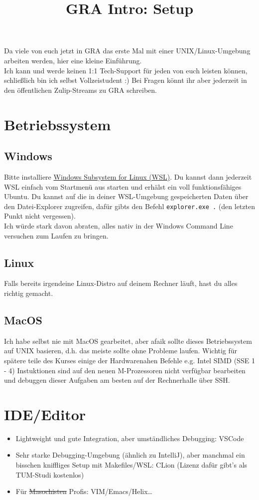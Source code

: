\documentclass{article}
\title{\vspace{-4cm}GRA Intro: Setup}
\date{}
\author{}
\begin{document}
\maketitle
\vspace{-1.5cm}

Da viele von euch jetzt in GRA das erste Mal mit 
einer UNIX/Linux-Umgebung arbeiten werden, hier eine kleine Einführung.\\ Ich kann und werde keinen 1:1 Tech-Support für jeden von euch leisten
können, schließlich bin ich selbst Vollzeistudent :) Bei Fragen könnt ihr aber jederzeit in den öffentlichen Zulip-Streams zu 
GRA schreiben.

\section{Betriebssystem}
    \subsection{Windows}
    Bitte installiere \href{https://learn.microsoft.com/de-de/windows/wsl/install}{Windows Subsystem for Linux (WSL)}.
    Du kannst dann jederzeit WSL einfach vom Startmenü aus starten und erhälst ein voll funktionsfähiges Ubuntu.
    Du kannst auf die in deiner WSL-Umgebung gespeicherten Daten über den Datei-Explorer zugreifen, dafür gibts den Befehl
    \glqq\verb|explorer.exe .|\grqq{} (den letzten Punkt nicht vergessen).\\
    Ich würde stark davon abraten, alles nativ in der Windows Command Line versuchen zum Laufen zu bringen.
    \subsection{Linux}
    Falls bereits irgendeine Linux-Distro auf deinem Rechner läuft, hast du alles
    richtig gemacht.
    \subsection{MacOS}
    Ich habe selbst nie mit MacOS gearbeitet, aber afaik sollte dieses Betriebssystem
    auf UNIX basieren, d.h. das meiste sollte ohne Probleme laufen. 
    Wichtig für spätere teile des Kurses einige der Hardwarenahen Befehle e.g. Intel SIMD (SSE 1 - 4) Instuktionen sind auf den neuen M-Prozessoren nicht verfügbar
    bearbeiten und debuggen dieser Aufgaben am besten auf der Rechnerhalle über SSH.
\section{IDE/Editor}
\begin{itemize}
    \item Lightweight und gute Integration, aber umständliches Debugging: VSCode
    \item Sehr starke Debugging-Umgebung (ähnlich zu IntelliJ), aber manchmal ein bisschen kniffliges Setup mit Makefiles/WSL: CLion (Lizenz dafür gibt's als TUM-Studi kostenlos)
    \item Für \sout{Masochisten} Profis: VIM/Emacs/Helix\ldots
\end{itemize}
\end{document}
